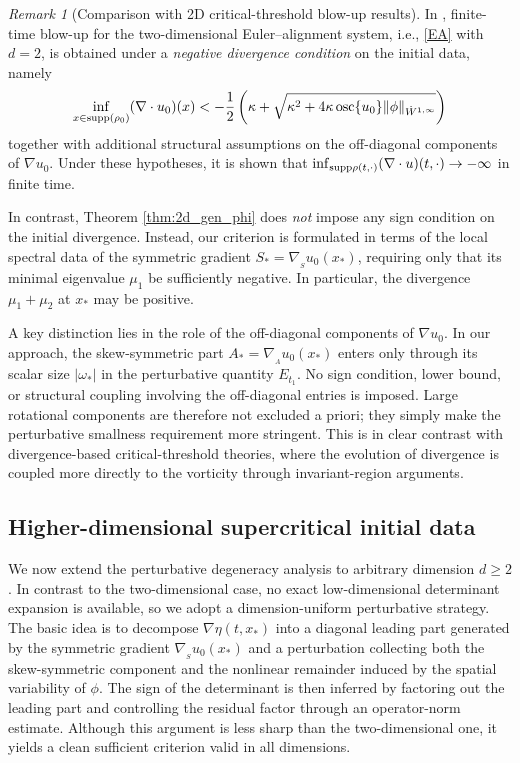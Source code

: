 \documentclass[11pt]{amsart}
\numberwithin{equation}{section}
\theoremstyle{definition}
\theoremstyle{remark}
\newtheorem{remark}[theorem]{Remark}
\numberwithin{equation}{section}
\newtheorem{remark}[theorem]{Remark}
\newcommand{\lt}{\left}
\newcommand{\rt}{\right}
\newcommand{\supp}{{\rm supp}}
\newcommand{\nabS}{\nabla_{\!\!{}_S}}
\newcommand{\nabA}{\nabla_{\!\!{}_A}}
\newcommand{\rdv}{\textnormal{osc}\{u_0\}}
\renewcommand{\ge}{\geqslant}
\begin{document}
\begin{remark}[Comparison with 2D critical-threshold blow-up results]\label{rem:2d_CT_blowup_comp}
In \cite{TT14},  finite-time blow-up for the two-dimensional Euler--alignment system, i.e., \eqref{EA} with $d=2$, is obtained under a \emph{negative divergence condition} on the initial data, namely
\[
\inf_{x \in \supp(\rho_0)} (\nabla \cdot u_0)(x) < -\frac12 \lt(\kappa + \sqrt{\kappa^2 + 4 \kappa\, \rdv  \|\phi\|_{\dot W^{1,\infty}}} \rt)
\]
together with additional structural assumptions on the off-diagonal components of
$\nabla u_0$. Under these hypotheses, it is shown that $\inf_{\supp\rho(t,\cdot)}(\nabla \cdot u)(t,\cdot)\to-\infty$ in finite time.

In contrast, Theorem \ref{thm:2d_gen_phi} does \emph{not} impose any sign condition on the initial divergence. Instead, our criterion is formulated in terms of the local spectral data of the symmetric gradient $S_*=\nabS u_0(x_*)$, requiring only that its minimal eigenvalue $\mu_1$ be sufficiently negative. In particular, the divergence $\mu_1+\mu_2$ at $x_*$ may be positive.

A key distinction lies in the role of the off-diagonal components of $\nabla u_0$. In our approach, the skew-symmetric part $A_*=\nabA u_0(x_*)$ enters only through its scalar size $|\omega_*|$ in the perturbative quantity $E_{t_1}$. No sign condition, lower bound, or structural coupling involving the off-diagonal entries is imposed. Large rotational components are therefore not excluded a priori; they simply make the perturbative smallness requirement more stringent. This is in clear contrast with divergence-based critical-threshold theories, where the evolution of divergence is coupled more directly to the vorticity through invariant-region arguments.
\end{remark}

 
%
%
%                       
%
%

 

\subsection{Higher-dimensional supercritical initial data}

We now extend the   perturbative degeneracy analysis to arbitrary dimension $d\ge2$. In contrast to the two-dimensional case, no exact low-dimensional determinant expansion is available, so we adopt a dimension-uniform perturbative strategy. The basic idea is to decompose $\nabla\eta(t,x_*)$ into a diagonal leading part generated by the symmetric gradient $\nabS u_0(x_*)$ and a perturbation collecting both the skew-symmetric component and the nonlinear remainder induced by the spatial variability of $\phi$. The sign of the determinant is then inferred by factoring out the leading part and controlling the residual factor through an operator-norm estimate. Although this argument is less sharp than the two-dimensional one, it yields a clean sufficient criterion valid in all dimensions.  
\end{document}
